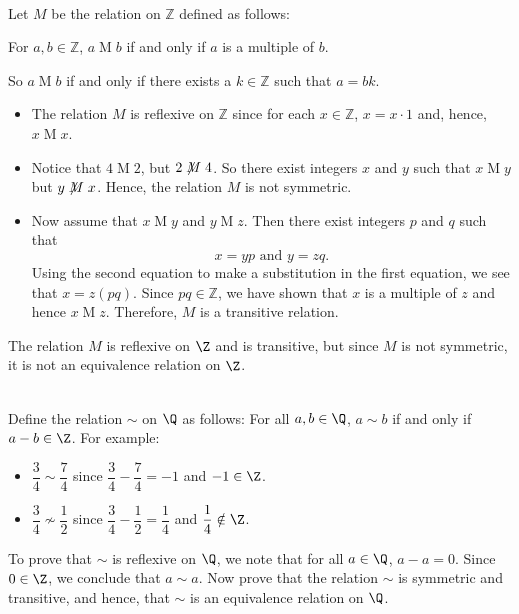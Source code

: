 \begin{example} \hfill \\
Let  $M$  be the relation on  $\mathbb{Z}$  defined as follows:

\begin{list}{}
\item For  $a, b \in \mathbb{Z}$,  $a \mathrel{M} b$  if and only if  $a$  is a multiple of  $b$.
\end{list}
\vskip6pt
\noindent
So $a \mathrel{M} b$ if and only if there exists a  $k \in \mathbb{Z}$ such that  
$a = b k$.

\begin{itemize}
\item The relation  $M$  is reflexive on  $\mathbb{Z}$ since for each  $x \in \mathbb{Z}$,  
$x = x \cdot 1$ and, hence, $x \mathrel{M} x$.

\item Notice that  $4 \mathrel{M} 2$, but  $2 \mathrel{\not \negthickspace M} 4$.  So there exist integers  $x$  and  $y$  such that  $x \mathrel{M} y$ but  
$y \mathrel{\not \negthickspace M} x$. Hence, the relation  $M$  is not symmetric.

\item Now assume that  $x \mathrel{M} y$ and  $y \mathrel{M} z$.  Then there exist integers  $p$  and  $q$  such that
\[
x = y  p\text{  and  }y = z q .
\]
Using the second equation to make a substitution in the first equation, we see that  
$x = z \left( {p q} \right)$.  Since  $p q \in \mathbb{Z}$, we have shown that  $x$  is a multiple of  $z$ and hence  $x \mathrel{M} z$.  Therefore,  $M$  is a transitive relation.
\end{itemize}
\end{example}
\noindent
The relation $M$ is reflexive on $\Z$ and is transitive, but since $M$ is not symmetric, it is not an equivalence relation on $\Z$.
\hbreak

\begin{prog} \label{prog:example-equiv} \hfill \\
Define the relation  $\sim$  on  $\Q$  as follows:  For all $a, b \in \Q$,
$a \sim b$  if and only if  $a - b \in \Z $.  For example:
\begin{itemize}
  \item  $\dfrac{3}{4} \sim \dfrac{7}{4}$ since $\dfrac{3}{4} - \dfrac{7}{4} = -1$ and $-1 \in \Z$.
  \item $\dfrac{3}{4} \not  \sim \dfrac{1}{2}$ since $\dfrac{3}{4} - \dfrac{1}{2} = \dfrac{1}{4}$ and 
$\dfrac{1}{4} \notin \Z$.
\end{itemize}
To prove that $\sim$ is reflexive on $\Q$, we note that for all $a \in \Q$, $a - a = 0$.  Since $0 \in \Z$, we conclude that $a \sim a$.  Now prove that the relation $\sim$ is symmetric and transitive, and hence, that 
$\sim$ is an equivalence relation on $\Q$.
\end{prog}
\hbreak

\endinput
